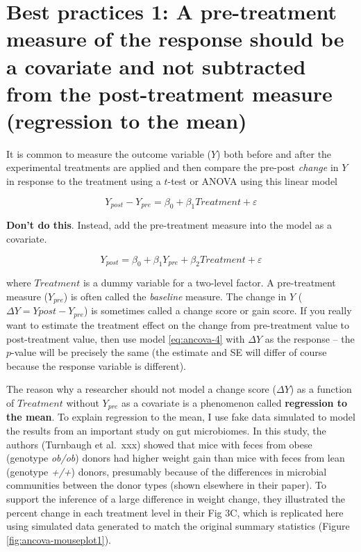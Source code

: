 \documentclass[]{book}
\begin{document}
\hypertarget{best-practices-1-a-pre-treatment-measure-of-the-response-should-be-a-covariate-and-not-subtracted-from-the-post-treatment-measure-regression-to-the-mean}{%
\section{Best practices 1: A pre-treatment measure of the response should be a covariate and not subtracted from the post-treatment measure (regression to the mean)}\label{best-practices-1-a-pre-treatment-measure-of-the-response-should-be-a-covariate-and-not-subtracted-from-the-post-treatment-measure-regression-to-the-mean}}

It is common to measure the outcome variable (\(Y\)) both before and after the experimental treatments are applied and then compare the pre-post \emph{change} in \(Y\) in response to the treatment using a \(t\)-test or ANOVA using this linear model

\begin{equation}
Y_{post}-Y_{pre} = \beta_0 + \beta_1 Treatment + \varepsilon
\label{eq:cov-change-score}
\end{equation}

\textbf{Don't do this}. Instead, add the pre-treatment measure into the model as a covariate.

\begin{equation}
Y_{post} = \beta_0 + \beta_1 Y_{pre} + \beta_2 Treatment + \varepsilon
\label{eq:ancova-4}
\end{equation}

where \(Treatment\) is a dummy variable for a two-level factor. A pre-treatment measure (\(Y_{pre}\)) is often called the \emph{baseline} measure. The change in \(Y\) (\(\Delta Y = Y{post} - Y_{pre}\)) is sometimes called a change score or gain score. If you really want to estimate the treatment effect on the change from pre-treatment value to post-treatment value, then use model \eqref{eq:ancova-4} with \(\Delta Y\) as the response -- the \(p\)-value will be precisely the same (the estimate and SE will differ of course because the response variable is different).

The reason why a researcher should not model a change score (\(\Delta Y\)) as a function of \(Treatment\) without \(Y_{pre}\) as a covariate is a phenomenon called \textbf{regression to the mean}. To explain regression to the mean, I use fake data simulated to model the results from an important study on gut microbiomes. In this study, the authors (Turnbaugh et al.~xxx) showed that mice with feces from obese (genotype \emph{ob/ob}) donors had higher weight gain than mice with feces from lean (genotype \emph{+/+}) donors, presumably because of the differences in microbial communities between the donor types (shown elsewhere in their paper). To support the inference of a large difference in weight change, they illustrated the percent change in each treatment level in their Fig 3C, which is replicated here using simulated data generated to match the original summary statistics (Figure \ref{fig:ancova-mouseplot1}).
\end{document}
